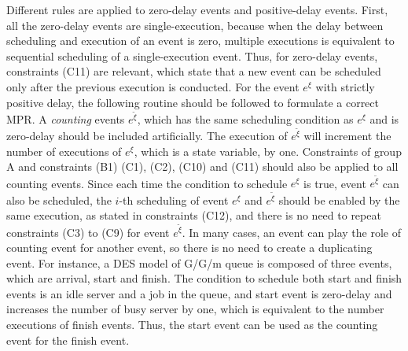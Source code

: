 \documentclass[]{interact}
\theoremstyle{plain}%
\theoremstyle{definition}
\theoremstyle{remark}
\begin{document}
Different rules are applied to zero-delay events and positive-delay events. First, all the zero-delay events are single-execution, because when the delay between scheduling and execution of an event is zero, multiple executions is equivalent to sequential scheduling of a single-execution event. Thus, for zero-delay events, constraints (C11) are relevant, which state that a new event can be scheduled only after the previous execution is conducted. For the event $e^{\xi}$ with strictly positive delay, the following routine should be followed to formulate a correct MPR. A \textit{counting} events ${e}^{\tilde{\xi}}$, which has the same  scheduling condition as $e^{\xi}$ and is zero-delay should be included artificially. The execution of ${e}^{\tilde{\xi}}$ will increment the number of executions of $e^{\xi}$, which is a state variable, by one. Constraints of group A and constraints (B1) (C1), (C2), (C10) and (C11) should also be applied to all counting events. Since each time the condition to schedule $e^{\xi}$ is true, event ${e}^{\tilde{\xi}}$ can also be scheduled, the $i$-th scheduling of event $e^{\xi}$ and ${e}^{\tilde{\xi}}$ should be enabled by the same execution, as stated in constraints (C12), and there is no need to repeat constraints (C3) to (C9) for event ${e}^{\tilde{\xi}}$. In many cases, an event can play the role of counting event for another event, so there is no need to create a duplicating event. For instance, a DES model of G/G/m queue is composed of three events, which are arrival, start and finish. The condition to schedule both start and finish events is an idle server and a job in the queue, and start event is zero-delay and increases the number of busy server by one, which is equivalent to the number executions of finish events. Thus, the start event can be used as the counting event for the finish event.
\end{document}
